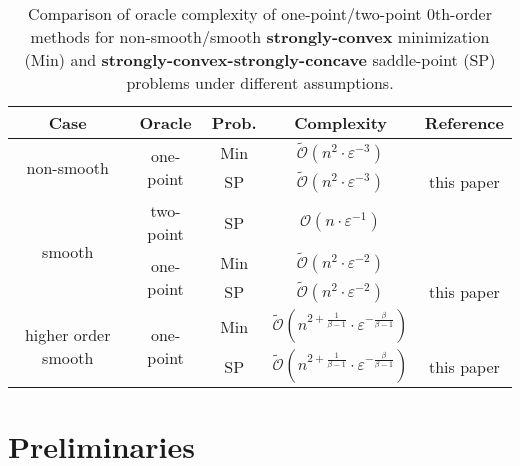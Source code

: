 \documentclass[runningheads]{llncs}
\begin{document}
\begin{table}[h!]
\begin{center}
\begin{tabular}{ccccc}
\textbf{Case}  &  \textbf{Oracle} & \textbf{Prob.} & \textbf{Complexity}  & \textbf{Reference}  \\ \hline
\multirow{2}{*}{non-smooth} 
                  & \multirow{2}{*}{one-point} & Min  & $\mathcal{\tilde O} \left( n^{2} \cdot\varepsilon^{-3}\right)$  & \cite{gasnikov2017stochastic}  \\ \cline{3-5} 
                  &          & SP & $\mathcal{\tilde O} \left( n^{2} \cdot \varepsilon^{-3}\right)$  & this paper  \\ \hline
\multirow{3}{*}{smooth} & two-point            & SP  & $\mathcal{O} \left( n \cdot \varepsilon^{-1} \right)$  & \cite{sadiev2020zeroth}  \\ \cline{2-5} 
                  & \multirow{2}{*}{ one-point} & Min& 
                  $\tilde{\mathcal{O}} \left( n^2 \cdot \varepsilon^{-2} \right)$
                  & \cite{gasnikov2017stochastic} 
                  \\ \cline{3-5} 
                  &          & SP  & 
                  $\tilde{\mathcal{O}} \left( n^2 \cdot \varepsilon^{-2} \right)$
                  & this paper \\ \hline
                  
\multirow{2}{*}{higher order smooth} 
                  & \multirow{2}{*}{ one-point} & Min  & 
                  $\tilde{\mathcal{O}} \left(n^{2+\frac{1}{\beta-1}} \cdot \varepsilon^{-\frac{\beta}{\beta-1}} \right)$
                  & \cite{novitskii2021improved,akhavan2020exploiting} 
                  \\ \cline{3-5} 
                  &          &                  SP  & 
                  $\tilde{\mathcal{O}} \left(n^{2+\frac{1}{\beta-1}} \cdot \varepsilon^{-\frac{\beta}{\beta-1}} \right)$
                  & this paper \\ \hline
\end{tabular}
\end{center}
\caption{Comparison of oracle complexity of one-point/two-point 0th-order methods for non-smooth/smooth \textbf{strongly-convex} minimization (Min) and \textbf{strongly-convex-strongly-concave} saddle-point (SP) problems under different assumptions.}
\label{summary_2}
\end{table}

\section{Preliminaries}
\end{document}
